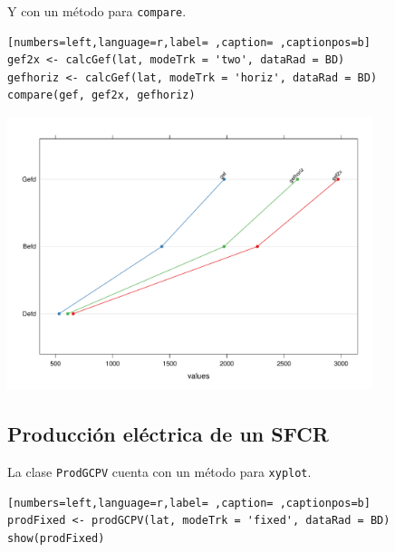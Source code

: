 Y con un método para \texttt{compare}.
\begin{lstlisting}[numbers=left,language=r,label= ,caption= ,captionpos=b]
gef2x <- calcGef(lat, modeTrk = 'two', dataRad = BD)
gefhoriz <- calcGef(lat, modeTrk = 'horiz', dataRad = BD)
compare(gef, gef2x, gefhoriz)
\end{lstlisting}

\begin{center}
\includegraphics[width=0.8\textwidth]{figuras/codigo-gef2.pdf}
\end{center}


\subsection{Producción eléctrica de un SFCR}
\label{sec:org7b16178}
La clase \texttt{ProdGCPV} cuenta con un método para \texttt{xyplot}.
\begin{lstlisting}[numbers=left,language=r,label= ,caption= ,captionpos=b]
prodFixed <- prodGCPV(lat, modeTrk = 'fixed', dataRad = BD)
show(prodFixed)
\end{lstlisting}


